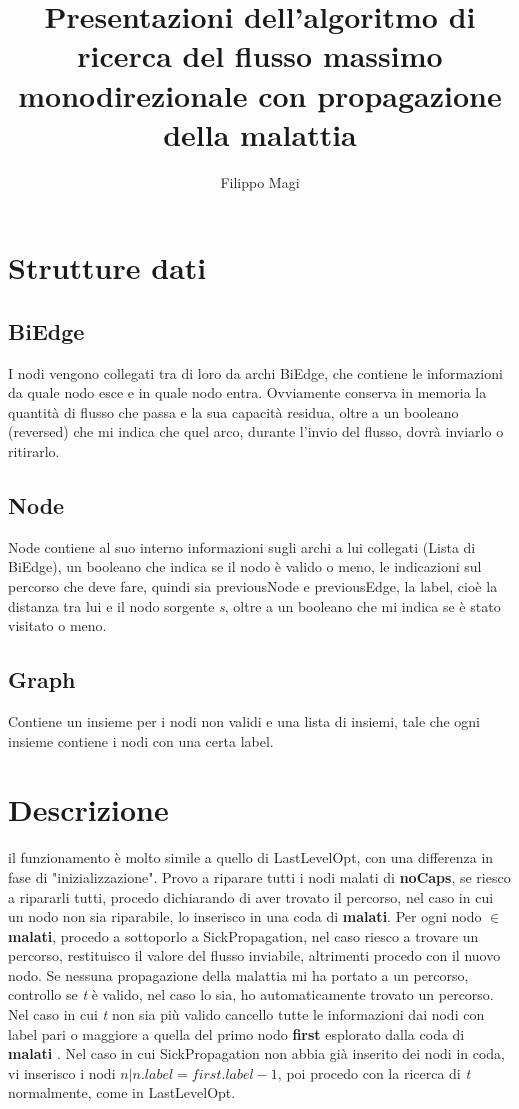 \documentclass{article}
\title{Presentazioni dell'algoritmo di ricerca del flusso massimo monodirezionale con propagazione della malattia  }
\author{Filippo Magi }
\begin{document}
\maketitle

\section{Strutture dati}
\subsection{BiEdge}
I nodi vengono collegati tra di loro da archi BiEdge, che contiene le informazioni da quale nodo esce e in quale nodo entra.
Ovviamente conserva in memoria la quantità di flusso che passa e la sua capacità residua, oltre a un booleano (reversed) che mi indica che quel arco, durante l'invio del flusso, dovrà inviarlo o ritirarlo.

\subsection{Node}

Node contiene al suo interno informazioni sugli archi a lui collegati (Lista di BiEdge),
un booleano che indica se il nodo è valido o meno,
le indicazioni sul percorso che deve fare, quindi sia previousNode e previousEdge,
la label, cioè la distanza tra lui e il nodo sorgente \textit{s},
oltre a un booleano che mi indica se è stato visitato o meno.
\subsection{Graph}
Contiene un insieme per i nodi non validi
e una lista di insiemi, tale che ogni insieme contiene i nodi
con una certa label.

\section{Descrizione}

il funzionamento è molto simile a quello di LastLevelOpt,
con una differenza in fase di "inizializzazione".
Provo a riparare tutti i nodi malati di \textbf{noCaps},
se riesco a ripararli tutti, procedo dichiarando di aver trovato il percorso,
nel caso in cui un nodo non sia riparabile, lo inserisco in una coda di \textbf{malati}.
Per ogni nodo $\in$ \textbf{malati}, procedo a sottoporlo a SickPropagation,
nel caso riesco a trovare un percorso, restituisco il valore del flusso inviabile, altrimenti procedo con il nuovo nodo.
Se nessuna propagazione della malattia mi ha portato a un percorso, controllo se \textit{t} è valido, nel caso lo sia, ho automaticamente trovato un percorso.
Nel caso in cui \textit{t} non sia più valido cancello tutte le informazioni dai nodi con label pari o maggiore
a quella del primo nodo \textbf{first} esplorato dalla coda di \textbf{malati} .
Nel caso in cui SickPropagation non abbia già inserito dei nodi in coda, vi inserisco i nodi $n | n.label = first.label -1$,
poi procedo con la ricerca di \textit{t} normalmente, come in LastLevelOpt.
\end{document}
